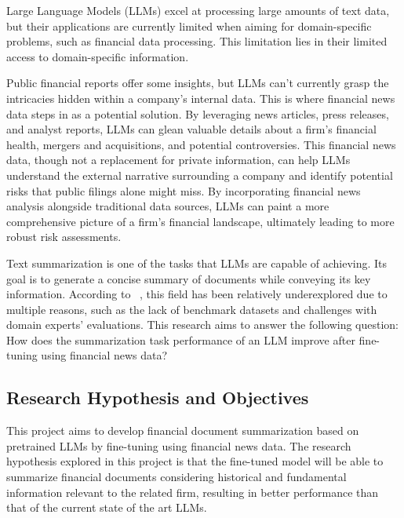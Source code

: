 Large Language Models (LLMs) excel at processing large amounts of text data, but their applications are currently
limited when aiming for domain-specific problems, such as financial data processing.
This limitation lies in their limited access to domain-specific information.

Public financial reports offer some insights, but LLMs can't currently grasp the intricacies hidden within a company's
internal data.
This is where financial news data steps in as a potential solution.
By leveraging news articles, press releases, and analyst reports, LLMs can glean valuable details about a firm's
financial health, mergers and acquisitions, and potential controversies.
This financial news data, though not a replacement for private information, can help LLMs understand the external
narrative surrounding a company and identify potential risks that public filings alone might miss.
By incorporating financial news analysis alongside traditional data sources, LLMs can paint a more comprehensive
picture of a firm's financial landscape, ultimately leading to more robust risk assessments.

Text summarization is one of the tasks that LLMs are capable of achieving.
Its goal is to generate a concise summary of documents while conveying its key information.
According to ~\cite{Lee2024}, this field has been relatively underexplored due to multiple reasons, such as the lack of
benchmark datasets and challenges with domain experts' evaluations.
This research aims to answer the following question: How does the summarization task performance of an LLM improve
after fine-tuning using financial news data?

\subsection{Research Hypothesis and Objectives}\label{subsec:research-hypothesis-and-objectives}

%

This project aims to develop financial document summarization based on pretrained LLMs by fine-tuning using financial news
data.
The research hypothesis explored in this project is that the fine-tuned model will be able to summarize financial
documents considering historical and fundamental information relevant to the related firm, resulting in better
performance than that of the current state of the art LLMs.

